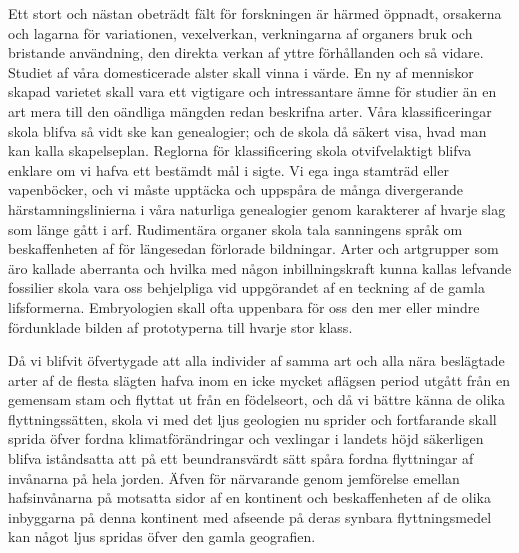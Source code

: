 Ett stort och nästan obeträdt fält för forskningen är härmed öppnadt, orsakerna och lagarna för variationen, vexelverkan, verkningarna af organers bruk och bristande användning, den direkta verkan af yttre förhållanden och så vidare. Studiet af våra domesticerade alster skall vinna i värde. En ny af menniskor skapad varietet skall vara ett vigtigare och intressantare ämne för studier än en art mera till den oändliga mängden redan beskrifna arter. Våra klassificeringar skola blifva så vidt ske kan genealogier; och de skola då säkert visa, hvad man kan kalla skapelseplan. Reglorna för klassificering skola otvifvelaktigt blifva enklare om vi hafva ett bestämdt mål i sigte. Vi ega inga stamträd eller vapenböcker, och vi måste upptäcka och uppspåra de många divergerande härstamningslinierna i våra naturliga genealogier genom karakterer af hvarje slag som länge gått i arf. Rudimentära organer skola tala sanningens språk om beskaffenheten af för längesedan förlorade bildningar. Arter och artgrupper som äro kallade aberranta och hvilka med någon inbillningskraft kunna kallas lefvande fossilier skola vara oss behjelpliga vid uppgörandet af en teckning af de gamla lifsformerna. Embryologien skall ofta uppenbara för oss den mer eller mindre fördunklade bilden af prototyperna till hvarje stor klass.

Då vi blifvit öfvertygade att alla individer af samma art och alla nära beslägtade arter af de flesta slägten hafva inom en icke mycket aflägsen period utgått från en gemensam stam och flyttat ut från en födelseort, och då vi bättre känna de olika flyttningssätten, skola vi med det ljus geologien nu sprider och fortfarande skall sprida öfver fordna klimatförändringar och vexlingar i landets höjd säkerligen blifva iståndsatta att på ett beundransvärdt sätt spåra fordna flyttningar af invånarna på hela jorden. Äfven för närvarande genom jemförelse emellan hafsinvånarna på motsatta sidor af en kontinent och beskaffenheten af de olika inbyggarna på denna kontinent med afseende på deras synbara flyttningsmedel kan något ljus spridas öfver den gamla geografien.

